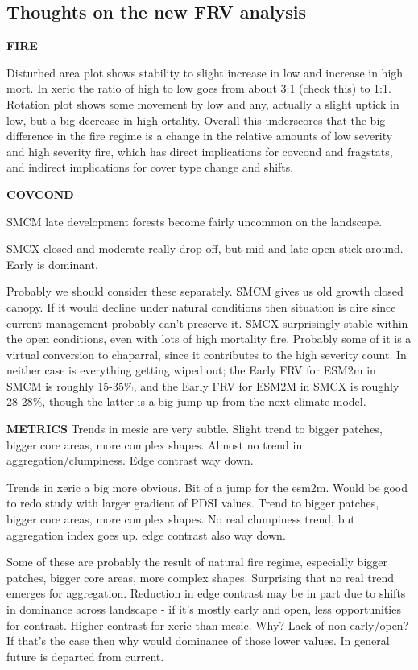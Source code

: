 \documentclass[12pt]{article}
\begin{document}
\begin{spacing}{1}
\section{Thoughts on the new FRV analysis}

\textbf{FIRE}

Disturbed area plot shows stability to slight increase in low and increase in high mort. In xeric the ratio of high to low goes from about 3:1 (check this) to 1:1. Rotation plot shows some movement by low and any, actually a slight uptick in low, but a big decrease in high ortality. Overall this underscores that the big difference in the fire regime is a change in the relative amounts of low severity and high severity fire, which has direct implications for covcond and fragstats, and indirect implications for cover type change and shifts.

\textbf{COVCOND}

SMCM late development forests become fairly uncommon on the landscape. 

SMCX closed and moderate really drop off, but mid and late open stick around. Early is dominant.

Probably we should consider these separately. SMCM gives us old growth closed canopy. If it would decline under natural conditions then situation is dire since current management probably can't preserve it. SMCX surprisingly stable within the open conditions, even with lots of high mortality fire. Probably some of it is a virtual conversion to chaparral, since it contributes to the high severity count. In neither case is everything getting wiped out; the Early FRV for ESM2m in SMCM is roughly 15-35\%, and the Early FRV for ESM2M in SMCX is roughly 28-28\%, though the latter is a big jump up from the next climate model. 

\textbf{METRICS}
Trends in mesic are very subtle. Slight trend to bigger patches, bigger core areas, more complex shapes. Almost no trend in aggregation/clumpiness. Edge contrast way down.

Trends in xeric a big more obvious. Bit of a jump for the esm2m. Would be good to redo study with larger gradient of PDSI values. Trend to bigger patches, bigger core areas, more complex shapes. No real clumpiness trend, but aggregation index goes up. edge contrast also way down. 

Some of these are probably the result of natural fire regime, especially bigger patches, bigger core areas, more complex shapes. Surprising that no real trend emerges for aggregation. Reduction in edge contrast may be in part due to shifts in dominance across landscape - if it's mostly early and open, less opportunities for contrast. Higher contrast for xeric than mesic. Why? Lack of non-early/open? If that's the case then why would dominance of those lower values. In general future is departed from current. 


\end{spacing}
\end{document}
